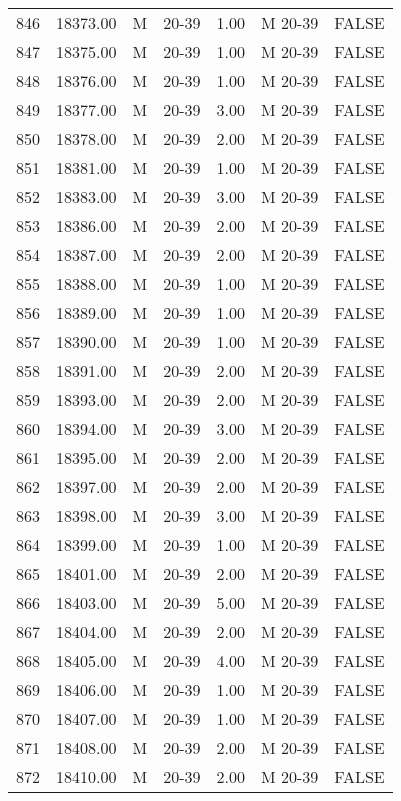 \begin{table}[ht]
\begin{tabular}{rrllrll}
  846 & 18373.00 & M & 20-39 & 1.00 & M 20-39 & FALSE \\ 
  847 & 18375.00 & M & 20-39 & 1.00 & M 20-39 & FALSE \\ 
  848 & 18376.00 & M & 20-39 & 1.00 & M 20-39 & FALSE \\ 
  849 & 18377.00 & M & 20-39 & 3.00 & M 20-39 & FALSE \\ 
  850 & 18378.00 & M & 20-39 & 2.00 & M 20-39 & FALSE \\ 
  851 & 18381.00 & M & 20-39 & 1.00 & M 20-39 & FALSE \\ 
  852 & 18383.00 & M & 20-39 & 3.00 & M 20-39 & FALSE \\ 
  853 & 18386.00 & M & 20-39 & 2.00 & M 20-39 & FALSE \\ 
  854 & 18387.00 & M & 20-39 & 2.00 & M 20-39 & FALSE \\ 
  855 & 18388.00 & M & 20-39 & 1.00 & M 20-39 & FALSE \\ 
  856 & 18389.00 & M & 20-39 & 1.00 & M 20-39 & FALSE \\ 
  857 & 18390.00 & M & 20-39 & 1.00 & M 20-39 & FALSE \\ 
  858 & 18391.00 & M & 20-39 & 2.00 & M 20-39 & FALSE \\ 
  859 & 18393.00 & M & 20-39 & 2.00 & M 20-39 & FALSE \\ 
  860 & 18394.00 & M & 20-39 & 3.00 & M 20-39 & FALSE \\ 
  861 & 18395.00 & M & 20-39 & 2.00 & M 20-39 & FALSE \\ 
  862 & 18397.00 & M & 20-39 & 2.00 & M 20-39 & FALSE \\ 
  863 & 18398.00 & M & 20-39 & 3.00 & M 20-39 & FALSE \\ 
  864 & 18399.00 & M & 20-39 & 1.00 & M 20-39 & FALSE \\ 
  865 & 18401.00 & M & 20-39 & 2.00 & M 20-39 & FALSE \\ 
  866 & 18403.00 & M & 20-39 & 5.00 & M 20-39 & FALSE \\ 
  867 & 18404.00 & M & 20-39 & 2.00 & M 20-39 & FALSE \\ 
  868 & 18405.00 & M & 20-39 & 4.00 & M 20-39 & FALSE \\ 
  869 & 18406.00 & M & 20-39 & 1.00 & M 20-39 & FALSE \\ 
  870 & 18407.00 & M & 20-39 & 1.00 & M 20-39 & FALSE \\ 
  871 & 18408.00 & M & 20-39 & 2.00 & M 20-39 & FALSE \\ 
  872 & 18410.00 & M & 20-39 & 2.00 & M 20-39 & FALSE \\ 

\end{tabular}
\end{table}
